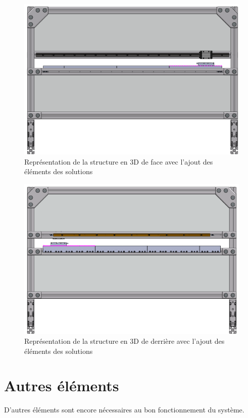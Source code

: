 \begin{figure}[H]
    \centering
    \includegraphics[width = \textwidth]{assets/figures/VueFace.png}
    \caption{Représentation de la structure en 3D de face avec l'ajout des éléments des solutions}
    \label{fig:VueFace}
\end{figure}

\begin{figure}[H]
    \centering
    \includegraphics[width = \textwidth]{assets/figures/VueDerriere.png}
    \caption{Représentation de la structure en 3D de derrière avec l'ajout des éléments des solutions}
    \label{fig:VueDerriere}
\end{figure}

\section{Autres éléments}\label{sec:AutreEle}
D'autres éléments sont encore nécessaires au bon fonctionnement du système.

